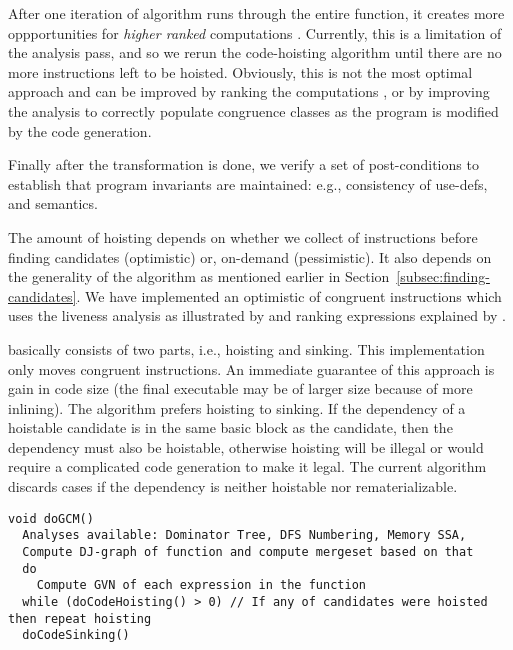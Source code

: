 \documentclass[acmlarge,review,anonymous]{acmart}\settopmatter{printfolios=true}
\begin{document}
After one iteration of algorithm runs through the entire function, it creates
more oppportunities for \emph{higher ranked} computations
\cite{rosen1988global}. Currently, this is a limitation of the \GVN{} analysis
pass, and so we rerun the code-hoisting algorithm until there are no more
instructions left to be hoisted.  Obviously, this is not the most optimal
approach and can be improved by ranking the computations \cite{rosen1988global},
or by improving the \GVN{} analysis to correctly populate congruence classes as
the program is modified by the code generation.

Finally after the transformation is done, we verify a set of post-conditions to
establish that program invariants are maintained: e.g., consistency of use-defs,
and \SSA{} semantics.

The amount of hoisting depends on whether we collect \GVN{} of instructions
before finding candidates (optimistic) or, on-demand (pessimistic). It also
depends on the generality of the \GVN{} algorithm as mentioned earlier in
Section~\ref{subsec:finding-candidates}. We have implemented an optimistic
\gcm{} of congruent instructions which uses the liveness analysis as
illustrated by \citet{das2012} and ranking expressions explained by
\citet{rosen1988global}.

\GCM{} basically consists of two parts, i.e., hoisting and sinking. This
implementation only moves congruent instructions. An immediate guarantee of this
approach is gain in code size (the final executable may be of larger size
because of more inlining). The algorithm prefers hoisting to sinking. If the
dependency of a hoistable candidate is in the same basic block as the candidate,
then the dependency must also be hoistable, otherwise hoisting will be illegal or
would require a complicated code generation to make it legal. The current
algorithm discards cases if the dependency is neither hoistable nor
rematerializable.

\begin{verbatim}
void doGCM()
  Analyses available: Dominator Tree, DFS Numbering, Memory SSA,
  Compute DJ-graph of function and compute mergeset based on that
  do
    Compute GVN of each expression in the function
  while (doCodeHoisting() > 0) // If any of candidates were hoisted then repeat hoisting
  doCodeSinking()
\end{verbatim}
\end{document}
